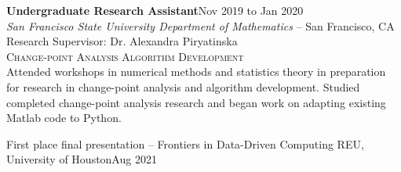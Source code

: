\documentclass[hidelinks, 10pt]{article}
\begin{document}
{{\vspace{4mm}


\begin{minipage}[ct]{0.9\linewidth}
\textbf{Undergraduate Research Assistant}\hfill Nov 2019 to Jan 2020\\
\emph{San Francisco State University Department of Mathematics} -- San Francisco, CA\\
Research Supervisor: Dr. Alexandra Piryatinska\\
{\textsc{Change-point Analysis Algorithm Development}}
\vspace{1mm}\\
Attended workshops in numerical methods and statistics theory in preparation for
research in change-point analysis and algorithm development.  Studied completed
change-point analysis research and began work on adapting existing Matlab code
to Python.
\end{minipage}

}

\vspace{7mm}


\hrulefill

\vspace{4mm}

\begin{minipage}[ct]{0.9\linewidth}
First place final presentation -- Frontiers in Data-Driven Computing REU,
University of Houston\hfill Aug 2021


\end{minipage}}
\end{document}
